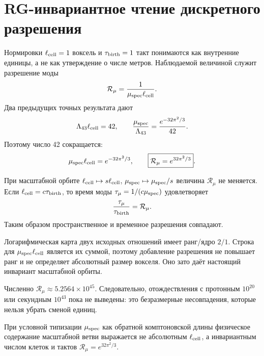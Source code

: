 \chapter{RG-инвариантное чтение дискретного разрешения}
\label{ch:v10-discrete-resolution-rg-readout}

Нормировки $\ell_{\rm cell}=1$ воксель и
$\tau_{\rm birth}=1$ такт понимаются как внутренние единицы, а не как
утверждение о числе метров. Наблюдаемой величиной служит разрешение моды
\begin{equation}
 \mathcal R_\mu=\frac1{\mu_{\rm spec}\ell_{\rm cell}}.
\end{equation}
Два предыдущих точных результата дают
\begin{equation}
 \Lambda_{43}\ell_{\rm cell}=42,
 \qquad
 \frac{\mu_{\rm spec}}{\Lambda_{43}}
 =\frac{e^{-32\pi^2/3}}{42}.
\end{equation}
Поэтому число 42 сокращается:
\begin{equation}
 \mu_{\rm spec}\ell_{\rm cell}=e^{-32\pi^2/3},
 \qquad
 \boxed{\mathcal R_\mu=e^{32\pi^2/3}}.
\end{equation}

При масштабной орбите
$\ell_{\rm cell}\mapsto s\ell_{\rm cell}$,
$\mu_{\rm spec}\mapsto\mu_{\rm spec}/s$ величина $\mathcal R_\mu$
не меняется. Если $\ell_{\rm cell}=c\tau_{\rm birth}$, то время моды
$\tau_\mu=1/(c\mu_{\rm spec})$ удовлетворяет
\begin{equation}
 \frac{\tau_\mu}{\tau_{\rm birth}}=\mathcal R_\mu.
\end{equation}
Таким образом пространственное и временное разрешения совпадают.

Логарифмическая карта двух исходных отношений имеет ранг/ядро $2/1$.
Строка для $\mu_{\rm spec}\ell_{\rm cell}$ является их суммой, поэтому
добавление разрешения не повышает ранг и не определяет абсолютный размер
вокселя. Оно зато даёт настоящий инвариант масштабной орбиты.

Численно $\mathcal R_\mu\approx5.2564\times10^{45}$. Следовательно,
отождествления с протонным $10^{20}$ или секундным $10^{43}$ пока не
выведены: это безразмерные несовпадения, которые нельзя убрать сменой единиц.

\begin{theorem}
При условной типизации $\mu_{\rm spec}$ как обратной комптоновской длины
физическое содержание масштабной ветви выражается не абсолютным
$\ell_{\rm cell}$, а инвариантным числом клеток и тактов
$\mathcal R_\mu=e^{32\pi^2/3}$.
\end{theorem}


